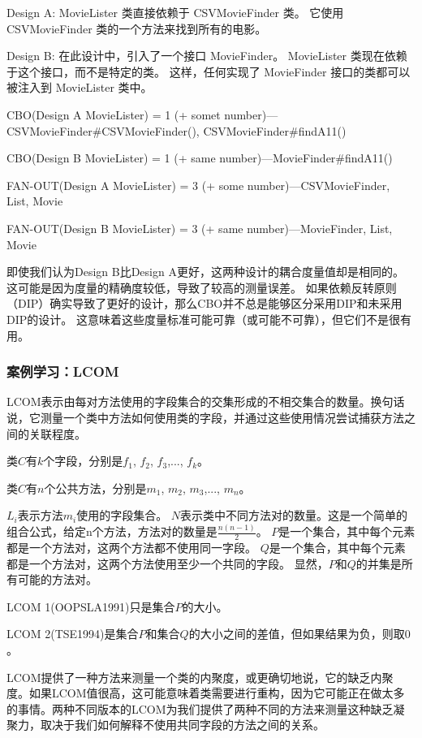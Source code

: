 Design A:
MovieLister 类直接依赖于 CSVMovieFinder 类。
它使用 CSVMovieFinder 类的一个方法来找到所有的电影。

Design B:
在此设计中，引入了一个接口 MovieFinder。
MovieLister 类现在依赖于这个接口，而不是特定的类。
这样，任何实现了 MovieFinder 接口的类都可以被注入到 MovieLister 类中。

CBO(Design A MovieLister) = 1 (+ somet number)—CSVMovieFinder\#CSVMovieFinder(), CSVMovieFinder\#findA11()

CBO(Design B MovieLister) = 1 (+ same number)—MovieFinder\#findA11()

FAN-OUT(Design A MovieLister) = 3 (+ some number)—CSVMovieFinder, List, Movie

FAN-OUT(Design B MovieLister) = 3 (+ same number)—MovieFinder, List, Movie

即使我们认为Design B比Design A更好，这两种设计的耦合度量值却是相同的。
这可能是因为度量的精确度较低，导致了较高的测量误差。
如果依赖反转原则（DIP）确实导致了更好的设计，那么CBO并不总是能够区分采用DIP和未采用DIP的设计。
这意味着这些度量标准可能可靠（或可能不可靠），但它们不是很有用。

\subsubsection{案例学习：LCOM}
LCOM表示由每对方法使用的字段集合的交集形成的不相交集合的数量。换句话说，它测量一个类中方法如何使用类的字段，并通过这些使用情况尝试捕获方法之间的关联程度。

类$C$有$k$个字段，分别是$f_1$, $f_2$, $f_3$,..., $f_k$。

类$C$有$n$个公共方法，分别是$m_1$, $m_2$, $m_3$,..., $m_n$。

$L_i$表示方法$m_i$使用的字段集合。
$N$表示类中不同方法对的数量。这是一个简单的组合公式，给定n个方法，方法对的数量是$\frac{n(n-1)}{2}$。
$P$是一个集合，其中每个元素都是一个方法对，这两个方法都不使用同一字段。
$Q$是一个集合，其中每个元素都是一个方法对，这两个方法使用至少一个共同的字段。
显然，$P$和$Q$的并集是所有可能的方法对。


LCOM 1(OOPSLA1991)只是集合$P$的大小。

LCOM 2(TSE1994)是集合$P$和集合$Q$的大小之间的差值，但如果结果为负，则取$0$。

LCOM提供了一种方法来测量一个类的内聚度，或更确切地说，它的缺乏内聚度。如果LCOM值很高，这可能意味着类需要进行重构，因为它可能正在做太多的事情。两种不同版本的LCOM为我们提供了两种不同的方法来测量这种缺乏凝聚力，取决于我们如何解释不使用共同字段的方法之间的关系。


